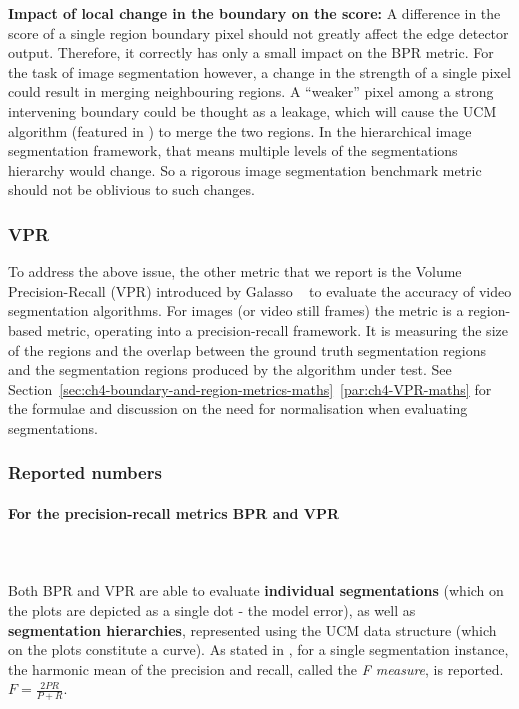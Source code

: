 \textbf{Impact of %
local change in the boundary on the score:} A difference in the score of a single region boundary pixel should not greatly affect the edge detector output. Therefore, it correctly has only a small impact on the BPR metric. For the task of image segmentation however, a change in the strength of a single pixel could result in merging neighbouring regions. A ``weaker'' pixel among a strong intervening boundary could be thought as a leakage, which will cause the UCM algorithm (featured in ) %
to merge the two regions. In the hierarchical image segmentation framework, that means multiple levels of the segmentations hierarchy would change. So a rigorous image segmentation benchmark metric should not be oblivious to such changes.

\subsubsection{VPR}
To address the above issue, the other metric that we report is the Volume Precision-Recall (VPR) introduced by Galasso \etal~\cite{Galasso13} to evaluate the accuracy of video segmentation algorithms. For images (or video still frames) the metric is a region-based metric, operating %
into a precision-recall framework. It is measuring the size of the regions and the overlap between the ground truth segmentation regions and the segmentation regions produced by the algorithm under test. 
See Section~\ref*{sec:ch4-boundary-and-region-metrics-maths}~\ref{par:ch4-VPR-maths} for the formulae and discussion on the need for normalisation when evaluating segmentations.

\subsubsection{Reported numbers}
\paragraph{For the precision-recall metrics BPR and VPR}\mbox{}\\\mbox{}\\
Both BPR and VPR are able to evaluate {\bf individual segmentations} (which on the plots are depicted as a single dot - the model error), as well as {\bf segmentation hierarchies}, represented using the UCM data structure (which on the plots constitute a curve). As stated in , for a single segmentation instance, the harmonic mean of the precision and recall, called the {\it F measure}, is reported. $F=\frac{2PR}{P+R}$.

